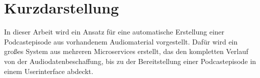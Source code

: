 \thispagestyle{empty}
\section*{Kurzdarstellung}
\label{sec:kurzdarstellung}
In dieser Arbeit wird ein Ansatz für eine automatische Erstellung einer Podcastepisode aus vorhandenem Audiomaterial vorgestellt.
Dafür wird ein großes System aus mehreren Microservices erstellt, das den kompletten Verlauf von der Audiodatenbeschaffung, bis zu der Bereitstellung einer Podcastepisode in einem Userinterface abdeckt.






